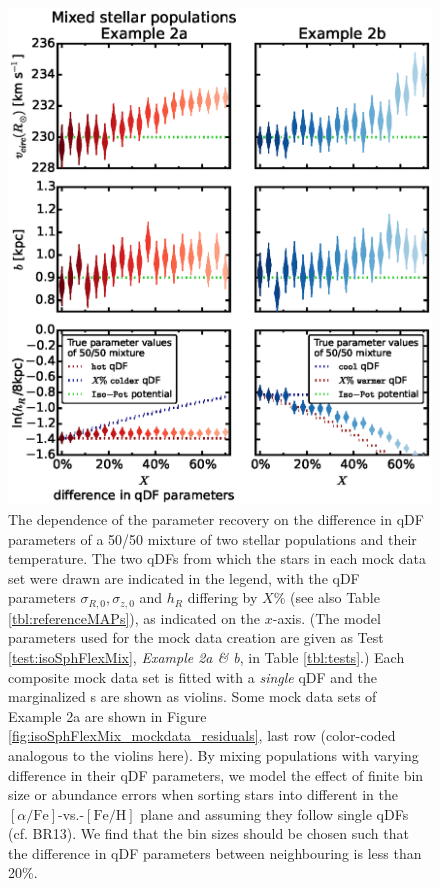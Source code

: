 \begin{figure}[!htbp]
\centering
\includegraphics[scale=0.45]{figs/isoSphFlexMixDiff_violins_2.eps}
\caption{The dependence of the parameter recovery on the difference in qDF parameters of a 50/50 mixture of two stellar populations and their temperature. The two qDFs from which the stars in each mock data set were drawn are indicated in the legend, with the qDF parameters $\sigma_{R,0}, \sigma_{z,0}$ and $h_R$ differing by $X\%$ (see also Table \ref{tbl:referenceMAPs}), as indicated on the $x$-axis. (The model parameters used for the mock data creation are given as Test \ref{test:isoSphFlexMix}, \emph{Example 2a \& b}, in Table \ref{tbl:tests}.) Each composite mock data set is fitted with a \emph{single} qDF and the marginalized \pdf{}s are shown as violins. Some mock data sets of Example 2a are shown in Figure \ref{fig:isoSphFlexMix_mockdata_residuals}, last row (color-coded analogous to the violins here). By mixing populations with varying difference in their qDF parameters, we model the effect of finite bin size or abundance errors when sorting stars into different \MAPs{} in the $[\alpha/\mathrm{Fe}]$-vs.-$[\mathrm{Fe}/\mathrm{H}]$ plane and assuming they follow single qDFs (cf. BR13). We find that the bin sizes should be chosen such that the difference in qDF parameters between neighbouring \MAPs{} is less than 20\%.} 
\label{fig:isoSphFlexMixDiff}
\end{figure}

